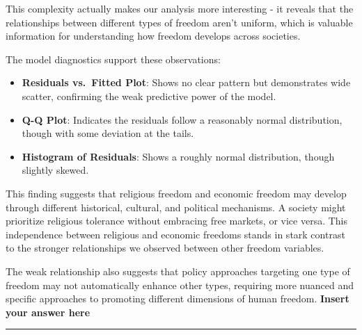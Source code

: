 \documentclass[
]{article}
\providecommand{\tightlist}{%
  \setlength{\itemsep}{0pt}\setlength{\parskip}{0pt}}
\begin{document}
This complexity actually makes our analysis more interesting - it
reveals that the relationships between different types of freedom aren't
uniform, which is valuable information for understanding how freedom
develops across societies.

The model diagnostics support these observations:

\begin{itemize}
\tightlist
\item
  \textbf{Residuals vs.~Fitted Plot}: Shows no clear pattern but
  demonstrates wide scatter, confirming the weak predictive power of the
  model.
\item
  \textbf{Q-Q Plot}: Indicates the residuals follow a reasonably normal
  distribution, though with some deviation at the tails.
\item
  \textbf{Histogram of Residuals}: Shows a roughly normal distribution,
  though slightly skewed.
\end{itemize}

This finding suggests that religious freedom and economic freedom may
develop through different historical, cultural, and political
mechanisms. A society might prioritize religious tolerance without
embracing free markets, or vice versa. This independence between
religious and economic freedoms stands in stark contrast to the stronger
relationships we observed between other freedom variables.

The weak relationship also suggests that policy approaches targeting one
type of freedom may not automatically enhance other types, requiring
more nuanced and specific approaches to promoting different dimensions
of human freedom. \textbf{Insert your answer here}

\begin{center}\rule{0.5\linewidth}{0.5pt}\end{center}
\end{document}
